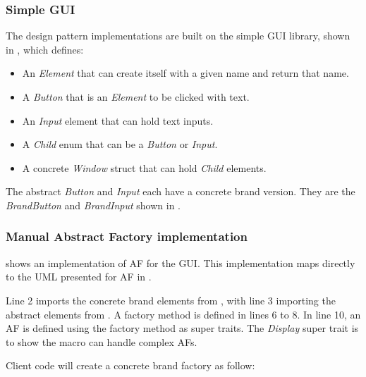 \subsubsection{Simple GUI}
The design pattern implementations are built on the simple GUI library, shown in , which defines:

\begin{itemize}
	\item An \textit{Element} that can create itself with a given name and return that name.
	\item A \textit{Button} that is an \textit{Element} to be clicked with text.
	\item An \textit{Input} element that can hold text inputs.
	\item A \textit{Child} enum that can be a \textit{Button} or \textit{Input}.
	\item A concrete \textit{Window} struct that can hold \textit{Child} elements.
\end{itemize}

The abstract \textit{Button} and \textit{Input} each have a concrete brand version.
They are the \textit{BrandButton} and \textit{BrandInput} shown in .

\subsubsection{Manual Abstract Factory implementation}
 shows an implementation of AF for the GUI.
This implementation maps directly to the UML presented for AF in .

Line 2 imports the concrete brand elements from , with line 3 importing the abstract elements from .
A factory method is defined in lines 6 to 8.
In line 10, an AF is defined using the factory method as super traits.
The \textit{Display} super trait is to show the macro can handle complex AFs.

Client code will create a concrete brand factory as follow:


